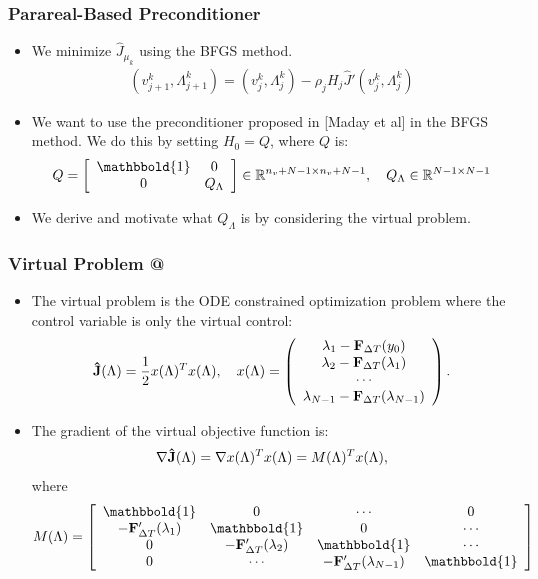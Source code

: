 \documentclass[9pt]{beamer}
\makeatletter
\newcommand*{\rom}[1]{\expandafter\@slowromancap\romannumeral #1@}
\makeatother
\begin{document}
\begin{frame}
\frametitle{Parareal-Based Preconditioner}
\begin{itemize}
\item{We minimize $\hat J_{\mu_k}$ using the BFGS method. {\small
\begin{align*}
(v_{j+1}^{k},\Lambda_{j+1}^{k}) = (v_j^k,\Lambda_j^k) - \rho_jH_j \hat J'(v_j^k,\Lambda_j^k)
\end{align*}}}
\item{We want to use the preconditioner proposed in [Maday et al] in the BFGS method. We do this by setting $H_0=Q$, where $Q$ is: {\small
\begin{align*}
Q = \left[ \begin{array}{cc}
	\mathbbold{1} & 0 \\
	0 & Q_{\Lambda} \\
	\end{array} \right]\in \mathbb{R}^{n_v+N-1\times n_v+N-1},\quad Q_{\Lambda}\in\mathbb{R}^{N-1\times N-1}
\end{align*}}}
\item{We derive and motivate what $Q_{\Lambda}$ is by considering the virtual problem.}
\end{itemize}
\end{frame}
\begin{frame}
\frametitle{Virtual Problem \rom{1}}
\begin{itemize}
\item{The virtual problem is the ODE constrained optimization problem where the control variable is only the virtual control:
{\tiny
\begin{align*}
\bold{ \hat J}(\Lambda) = \frac{1}{2} x(\Lambda)^Tx(\Lambda),\quad
x(\Lambda)=\left( \begin{array}{c}  
   \lambda_1 - \bold F_{\Delta T}(y_0) \\ 
   \lambda_2 - \bold F_{\Delta T}(\lambda_1) \\
   \cdots  \\
   \lambda_{N-1} -\bold F_{\Delta T}(\lambda_{N-1}) \\
   \end{array}  \right).
\end{align*}}}
\item{The gradient of the virtual objective function is:
{\tiny
\begin{align*}
\nabla \bold{\hat J}(\Lambda)= \nabla x(\Lambda)^T x(\Lambda) = M(\Lambda)^Tx(\Lambda),
\end{align*}}
where 
{\tiny
\begin{align*}
M(\Lambda)= \left[ \begin{array}{cccc}
   \mathbbold{1} & 0 & \cdots & 0 \\  
   -\bold{F}_{\Delta T}'(\lambda_{1}) & \mathbbold{1} & 0 & \cdots \\ 
   0 &-\bold{F}_{\Delta T}'(\lambda_{2}) & \mathbbold{1}  & \cdots \\
   0 &\cdots &-\bold{F}_{\Delta T}'(\lambda_{N-1}) & \mathbbold{1}  \\
   \end{array}  \right]
\end{align*}}}
\end{itemize}
\end{frame}
\end{document}
